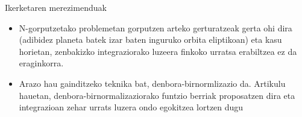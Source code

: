 \documentclass[
 10pt,%
 compress,%
 t,       %
 xcolor=svgnames
]{beamer}
\theoremstyle{definition} \newtheorem{definicion}{Definicion}[section]
\theoremstyle{propiedades} \newtheorem{propiedades}{Propiedades}[section]
\begin{document}
\begin{frame}{Ikerketaren merezimenduak}
{\begin{itemize}
\medskip
\item  N-gorputzetako problemetan gorputzen arteko gerturatzeak gerta ohi dira (adibidez planeta batek izar baten inguruko orbita eliptikoan) eta 
kasu horietan, zenbakizko integraziorako luzeera finkoko urratsa erabiltzea ez da eraginkorra.

\medskip
\item Arazo hau gainditzeko teknika bat, denbora-birnormlizazio da. Artikulu hauetan,  denbora-birnormalizaziorako funtzio berriak proposatzen dira eta integrazioan zehar  urrats luzera ondo egokitzea lortzen dugu

\end{itemize}






}

\end{frame}


\end{document}
